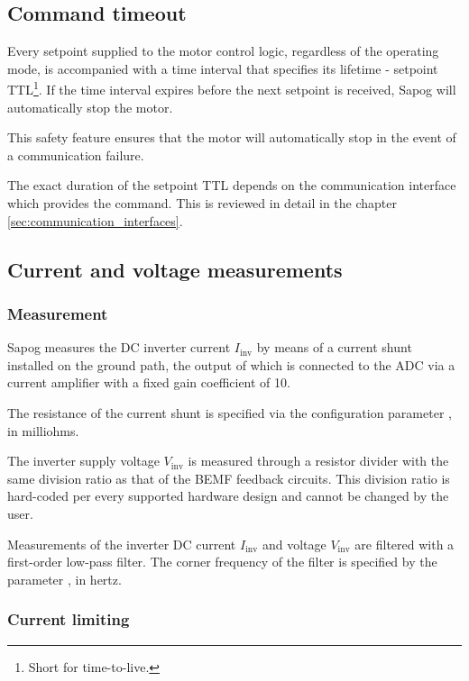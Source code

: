 \documentclass{zubaxdoc}
\begin{document}
\subsection{Command timeout}\label{sec:setpoint_ttl}

Every setpoint supplied to the motor control logic, regardless of the operating mode, is
accompanied with a time interval that specifies its lifetime - setpoint TTL\footnote{Short for time-to-live.}.
If the time interval expires before the next setpoint is received, Sapog will automatically
stop the motor.

This safety feature ensures that the motor will automatically stop in the event of a communication failure.

The exact duration of the setpoint TTL depends on the communication interface which provides the command.
This is reviewed in detail in the chapter \ref{sec:communication_interfaces}.

\subsection{Current and voltage measurements}

\subsubsection{Measurement}

Sapog measures the DC inverter current $I_\text{inv}$ by means of a current shunt installed on the ground path,
the output of which is connected to the ADC via a current amplifier with a fixed gain coefficient of 10.

The resistance of the current shunt is specified via the configuration parameter ,
in milliohms.

The inverter supply voltage $V_\text{inv}$ is measured through a resistor divider with the same
division ratio as that of the BEMF feedback circuits.
This division ratio is hard-coded per every supported hardware design and cannot be changed by the user.

Measurements of the inverter DC current $I_\text{inv}$ and voltage $V_\text{inv}$
are filtered with a first-order low-pass filter.
The corner frequency of the filter is specified by the parameter , in hertz.

\subsubsection{Current limiting}\label{sec:current_limiting}
\end{document}
